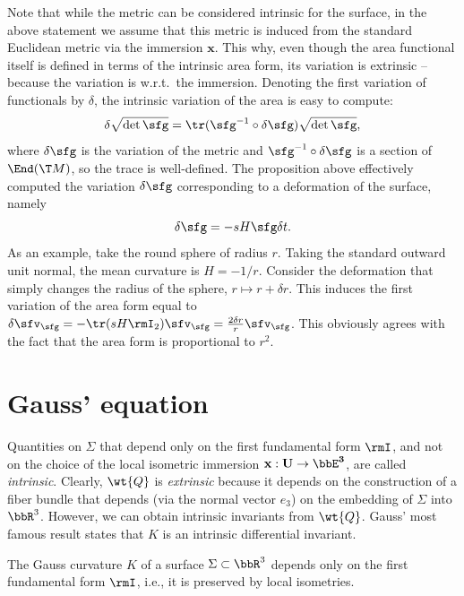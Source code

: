 \begin{rem}
    Note that while the metric can be considered intrinsic for the surface, in the above statement we assume that this metric is induced from the standard Euclidean metric via the immersion $\bm{x}$. This why, even though the area functional itself is defined in terms of the intrinsic area form, its variation is extrinsic -- because the variation is w.r.t.\ the immersion. Denoting the first variation of functionals by $\delta$, the intrinsic variation of the area is easy to compute:
    \[\delta \sqrt{\det\sfg}=\tr (\sfg^{-1}\circ \delta \sfg)\sqrt{\det\sfg},\]
    where $\delta\sfg$ is the variation of the metric and $\sfg^{-1}\circ \delta \sfg$ is a section of $\End(\T M)$, so the trace is well-defined. The proposition above effectively computed the variation $\delta\sfg$ corresponding to a deformation of the surface, namely 
    \[\delta\sfg=-sH\sfg\delta t.\]
    As an example, take the round sphere of radius $r$. Taking the standard outward unit normal, the mean curvature is $H=-1/r$. Consider the deformation that simply changes the radius of the sphere, $r\mapsto r+\delta r$. This induces the first variation of the area form equal to $\delta \sfv_{\sfg}=-\tr(sH \rmI_2)\sfv_{\sfg}=\frac{2\delta r}{r}\sfv_{\sfg}$. This obviously agrees with the fact that the area form is proportional to $r^2$.
\end{rem}











\section{Gauss' equation}


Quantities on $\Sigma$ that depend only on the first fundamental form $\rmI$, and not on the choice of the local isometric immersion $\bf{x}:U\to \bbE^3$, are called \emph{intrinsic}. Clearly, $\wt{Q}$ is \emph{extrinsic} because it depends on the construction of a fiber bundle that depends (via the normal vector $e_3$) on the embedding of $\Sigma$ into $\bbR^3$. However, we can obtain intrinsic invariants from $\wt{Q}$. Gauss' most famous result states that $K$ is an intrinsic differential invariant.

\begin{thm}\label{thm egregium}
    The Gauss curvature $K$ of a surface $\Sigma\subset\bbR^3$ depends only on the first fundamental form $\rmI$, i.e., it is preserved by local isometries.
\end{thm}

